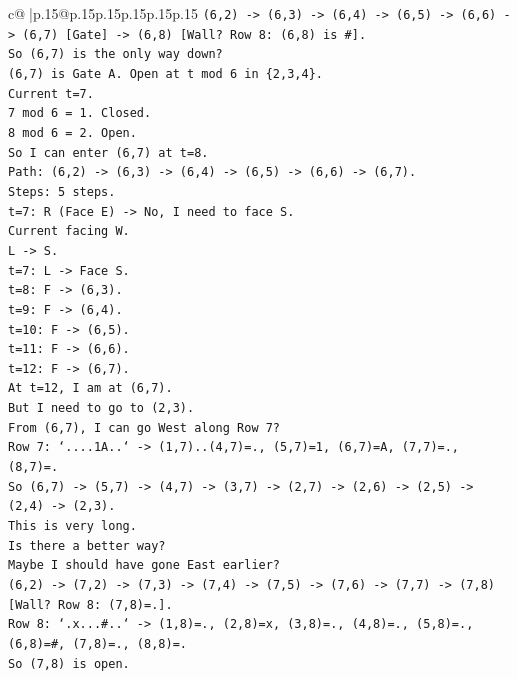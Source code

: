 \documentclass{article}
\begin{document}
{\begin{supertabular}{c@{$\;$}|p{.15\linewidth}@{}p{.15\linewidth}p{.15\linewidth}p{.15\linewidth}p{.15\linewidth}p{.15\linewidth}}
{{{\texttt{(6,2) {-}> (6,3) {-}> (6,4) {-}> (6,5) {-}> (6,6) {-}> (6,7) {[}Gate{]} {-}> (6,8) {[}Wall? Row 8: (6,8) is \#{]}.} \\
\texttt{So (6,7) is the only way down?} \\
\texttt{(6,7) is Gate A. Open at t mod 6 in \{2,3,4\}.} \\
\texttt{Current t=7.} \\
\texttt{7 mod 6 = 1. Closed.} \\
\texttt{8 mod 6 = 2. Open.} \\
\texttt{So I can enter (6,7) at t=8.} \\
\texttt{Path: (6,2) {-}> (6,3) {-}> (6,4) {-}> (6,5) {-}> (6,6) {-}> (6,7).} \\
\texttt{Steps: 5 steps.} \\
\texttt{t=7: R (Face E) {-}> No, I need to face S.} \\
\texttt{Current facing W.} \\
\texttt{L {-}> S.} \\
\texttt{t=7: L {-}> Face S.} \\
\texttt{t=8: F {-}> (6,3).} \\
\texttt{t=9: F {-}> (6,4).} \\
\texttt{t=10: F {-}> (6,5).} \\
\texttt{t=11: F {-}> (6,6).} \\
\texttt{t=12: F {-}> (6,7).} \\
\texttt{At t=12, I am at (6,7).} \\
\texttt{But I need to go to (2,3).} \\
\texttt{From (6,7), I can go West along Row 7?} \\
\texttt{Row 7: `....1A..` {-}> (1,7)..(4,7)=., (5,7)=1, (6,7)=A, (7,7)=., (8,7)=.} \\
\texttt{So (6,7) {-}> (5,7) {-}> (4,7) {-}> (3,7) {-}> (2,7) {-}> (2,6) {-}> (2,5) {-}> (2,4) {-}> (2,3).} \\
\texttt{This is very long.} \\
\texttt{Is there a better way?} \\
\texttt{Maybe I should have gone East earlier?} \\
\texttt{(6,2) {-}> (7,2) {-}> (7,3) {-}> (7,4) {-}> (7,5) {-}> (7,6) {-}> (7,7) {-}> (7,8) {[}Wall? Row 8: (7,8)=.{]}.} \\
\texttt{Row 8: `.x...\#..` {-}> (1,8)=., (2,8)=x, (3,8)=., (4,8)=., (5,8)=., (6,8)=\#, (7,8)=., (8,8)=.} \\
\texttt{So (7,8) is open.} \\
}}}
\end{supertabular}}
\end{document}
